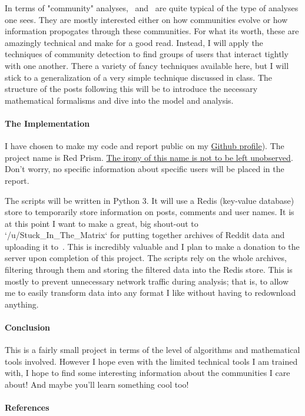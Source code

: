 In terms of "community" analyses,~\cite{c4} and~\cite{c5} are quite typical of the type of analyses one sees.
They are mostly interested either on how communities evolve or how information propogates through these communities.
For what its worth, these are amazingly technical and make for a good read.
Instead, I will apply the techniques of community detection to find groups of users that interact tightly with one another.
There a variety of fancy techniques available here, but I will stick to a generalization of a very simple technique discussed in class.
The structure of the posts following this will be to introduce the necessary mathematical formalisms and dive into the model and analysis.

\paragraph{The Implementation}
I have chosen to make my code and report public on my \href{https://github.com/rollends/red-prism}{Github profile}). The project name is Red Prism.
\href{https://en.wikipedia.org/wiki/PRISM_(surveillance_program)}{The irony of this name is not to be left unobserved}.
Don't worry, no specific information about specific users will be placed in the report.

The scripts will be written in Python 3.
It will use a Redis (key-value database) store to temporarily store information on posts, comments and user names.
It is at this point I want to make a great, big shout-out to `/u/Stuck\_In\_The\_Matrix` for putting together archives of Reddit data and uploading it to~\cite{c6}.
This is incredibly valuable and I plan to make a donation to the server upon completion of this project.
The scripts rely on the whole archives, filtering through them and storing the filtered data into the Redis store.
This is mostly to prevent unnecessary network traffic during analysis;
that is, to allow me to easily transform data into any format I like without having to redownload anything.

\paragraph{Conclusion}
This is a fairly small project in terms of the level of algorithms and mathematical tools involved.
However I hope even with the limited technical tools I am trained with, I hope to find some interesting information about the communities I care about!
And maybe you'll learn something cool too!

\paragraph{References}
\printbibliography
